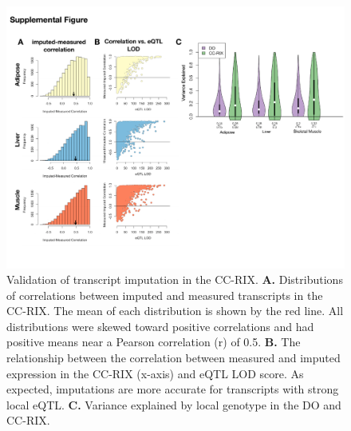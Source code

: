 \documentclass[
]{article}
\begin{document}
\begin{figure}[ht!]
\includegraphics[width=\textwidth]{Figures/Supp_Fig_CC-RIX_Imputation.pdf} 
\caption{Validation of transcript imputation in the CC-RIX. \textbf{A.} 
Distributions of correlations between imputed and measured transcripts 
in the CC-RIX. The mean of each distribution is shown by the red line. 
All distributions were skewed toward positive correlations and had
 positive means near a Pearson correlation (r) of 0.5. \textbf{B.} 
 The relationship between the correlation between measured and 
 imputed expression in the CC-RIX (x-axis) and eQTL LOD score. As 
 expected, imputations are more accurate for transcripts with strong 
 local eQTL. \textbf{C.} Variance explained by local genotype in the 
 DO and CC-RIX. 
}
\label{fig:cc_imputation}
\end{figure}
\end{document}
